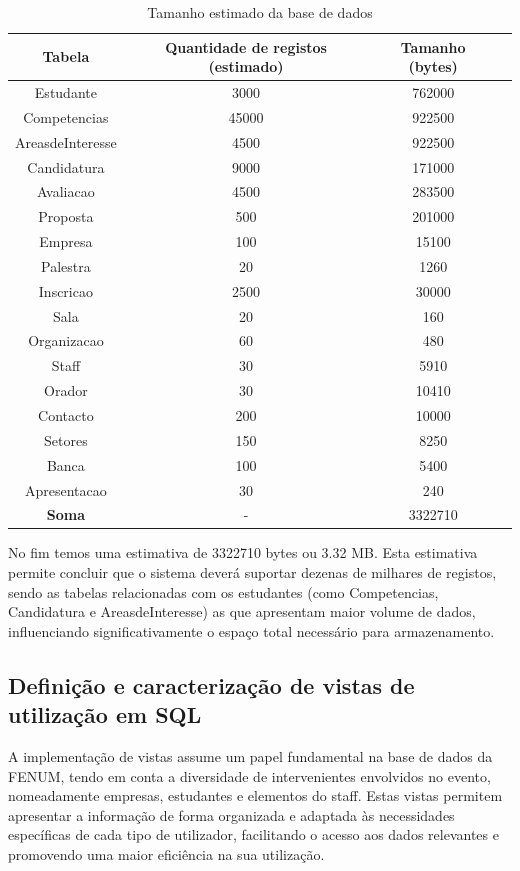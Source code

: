 \documentclass[12pt,a4paper]{article}
\renewcommand{\arraystretch}{1.5}  %
\begin{document}
\begin{table}[H]
\centering
\renewcommand{\arraystretch}{1.2}
\begin{tabular}{|c|c|c|c|}
\hline
\textbf{Tabela} & \textbf{Quantidade de registos (estimado)} & \textbf{Tamanho (bytes)}\\ \hline
Estudante & 3000 &  762000 \\ \hline
Competencias & 45000 & 922500 \\ \hline
AreasdeInteresse & 4500 & 922500 \\ \hline
Candidatura & 9000 & 171000 \\ \hline
Avaliacao & 4500 & 283500\\ \hline
Proposta & 500 & 201000 \\ \hline
Empresa & 100 & 15100\\ \hline
Palestra & 20 & 1260\\ \hline
Inscricao & 2500 & 30000\\ \hline
Sala & 20 & 160 \\ \hline
Organizacao & 60 & 480\\ \hline
Staff & 30 & 5910\\ \hline
Orador & 30 & 10410\\ \hline
Contacto & 200 & 10000\\ \hline
Setores & 150 & 8250\\ \hline
Banca & 100 & 5400\\ \hline
Apresentacao & 30 & 240\\ \hline
\textbf{Soma}& - &  3322710\\ \hline

\end{tabular}
\caption{Tamanho estimado da base de dados}
\end{table}

No fim temos uma estimativa de 3322710 bytes ou 3.32 MB. Esta estimativa permite
concluir que o sistema deverá suportar dezenas de milhares de registos, sendo as
tabelas relacionadas com os estudantes (como Competencias, Candidatura e
AreasdeInteresse) as que apresentam maior volume de dados, influenciando
significativamente o espaço total necessário para armazenamento.

\subsection{Definição e caracterização de vistas de utilização em SQL}

A implementação de vistas assume um papel fundamental na base de dados da FENUM,
tendo em conta a diversidade de intervenientes envolvidos no evento,
nomeadamente empresas, estudantes e elementos do staff. Estas vistas permitem
apresentar a informação de forma organizada e adaptada às necessidades
específicas de cada tipo de utilizador, facilitando o acesso aos dados
relevantes e promovendo uma maior eficiência na sua utilização.
\end{document}
